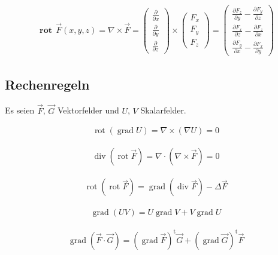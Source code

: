 \documentclass[a4paper]{scrartcl}
\begin{document}
\begin{align}
\mathbf{\operatorname{rot}}\,\vec F(x,y,z) = \nabla\times \vec F =
\begin{pmatrix} \frac{\partial}{\partial x} \\ \frac{\partial}{\partial y} \\
\frac{\partial}{\partial z} \end{pmatrix} \times \begin{pmatrix} F_x\\ F_y\\ F_z
\end{pmatrix} = \begin{pmatrix} \frac{\partial F_z}{\partial y} - \frac{\partial
F_y}{\partial z} \\ \frac{\partial F_x}{\partial z} - \frac{\partial
F_z}{\partial x} \\ \frac{\partial F_y}{\partial x} - \frac{\partial
F_x}{\partial y} \end{pmatrix}
\end{align}

\subsection{Rechenregeln}
Es seien $\vec F$, $\vec G$ Vektorfelder und $U$, $V$ Skalarfelder.

\begin{align}
\operatorname{rot}(\operatorname{grad}U)=\nabla \times (\nabla U) = 0
\end{align}

\begin{align}
\operatorname{div}(\operatorname{rot}\vec{F}) = \nabla \cdot (\nabla \times
\vec F) = 0
\end{align}

\begin{align}
\operatorname{rot}(\operatorname{rot}\vec{F}) =
\operatorname{grad}(\operatorname{div}\vec{F}) -\Delta \vec{F}
\end{align}

\begin{align}
\operatorname{grad}(UV)=U\operatorname{grad}V+V\operatorname{grad}U
\end{align}

\begin{align}
\operatorname{grad}(\vec{F}\cdot \vec{G}) =
(\operatorname{grad}\vec{F})^{\operatorname t}\vec{G} + (\operatorname{grad}\vec{G})^{\operatorname t}\vec{F}
\end{align}
\end{document}
